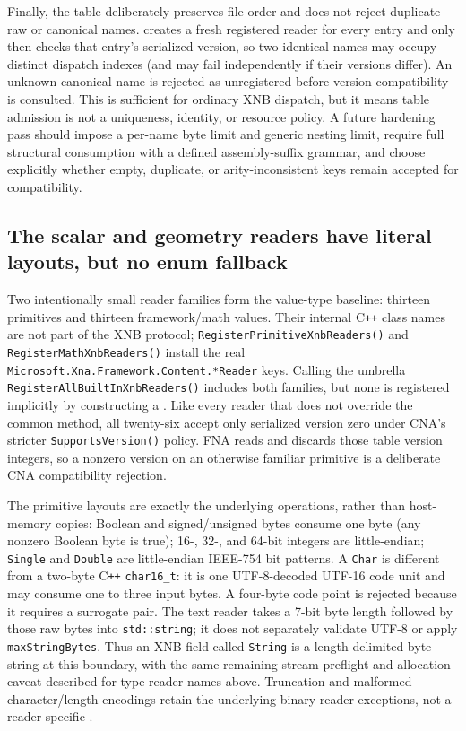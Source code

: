 Finally, the table deliberately preserves file order and does not reject duplicate raw or
canonical names.  creates a fresh registered reader for every entry and
only then checks that entry's serialized version, so two identical names may occupy distinct
dispatch indexes (and may fail independently if their versions differ). An unknown canonical name
is rejected as unregistered before version compatibility is consulted. This is sufficient for
ordinary XNB dispatch, but it means table admission is not a uniqueness, identity, or resource
policy. A future hardening pass should impose a per-name byte limit and generic nesting limit,
require full structural consumption with a defined assembly-suffix grammar, and choose explicitly
whether empty, duplicate, or arity-inconsistent keys remain accepted for compatibility.

\subsection{The scalar and geometry readers have literal layouts, but no enum fallback}
\label{sec:xnb-scalar-math-reader-contract}

Two intentionally small reader families form the value-type baseline: thirteen primitives and
thirteen framework/math values. Their internal C\texttt{++} class names are not part of the XNB
protocol; \texttt{RegisterPrimitiveXnbReaders()} and \texttt{RegisterMathXnbReaders()} install
the real \texttt{Microsoft.Xna.Framework.Content.*Reader} keys. Calling the umbrella
\texttt{RegisterAllBuiltInXnbReaders()} includes both families, but none is registered implicitly
by constructing a . Like every reader that does not override the common
method, all twenty-six accept only serialized version zero under CNA's stricter
\texttt{SupportsVersion()} policy. FNA reads and discards those table version integers, so a
nonzero version on an otherwise familiar primitive is a deliberate CNA compatibility rejection.

The primitive layouts are exactly the underlying  operations, rather than
host-memory copies: Boolean and signed/unsigned bytes consume one byte (any nonzero Boolean byte
is true); 16-, 32-, and 64-bit integers are little-endian; \texttt{Single} and
\texttt{Double} are little-endian IEEE-754 bit patterns. A \texttt{Char} is different from a
two-byte C\texttt{++} \texttt{char16\_t}: it is one UTF-8-decoded UTF-16 code unit and may consume
one to three input bytes. A four-byte code point is rejected because it requires a surrogate pair.
The text reader takes a 7-bit byte length followed by those raw bytes into \texttt{std::string};
it does not separately validate UTF-8 or apply \texttt{maxStringBytes}. Thus an XNB field called
\texttt{String} is a length-delimited byte string at this boundary, with the same remaining-stream
preflight and allocation caveat described for type-reader names above. Truncation and malformed
character/length encodings retain the underlying binary-reader exceptions, not a reader-specific
.

